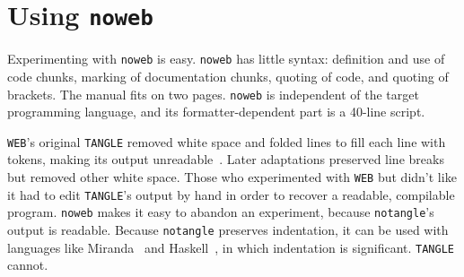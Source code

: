 \section{Using {\tt noweb}}%

Experimenting with \verb+noweb+ is easy.
{\tt noweb} has little syntax: definition and use of code chunks, marking of
documentation chunks, quoting of code, and quoting of brackets.
The manual fits on two pages.
\verb+noweb+ is independent of the target programming
language, and its formatter-dependent part is a 40-line script.

{\tt WEB}'s  original {\tt TANGLE} removed white space and folded
lines to fill each line with tokens,
making its output unreadable~\cite[Figure~3]{knuth:literate}.
Later adaptations preserved line breaks but removed other white space.
Those who experimented with {\tt WEB} but didn't like it had to
edit {\tt TANGLE}'s output by hand in order to recover a readable, compilable
program.
\verb+noweb+ makes it easy to abandon an experiment, because 
\verb+notangle+'s output is readable.
Because \verb+notangle+ preserves indentation, it can be used with
languages like Miranda~\cite{turner:miranda} and
Haskell~\cite{hudak:report}, in which indentation is significant.
 {\tt TANGLE} cannot.

